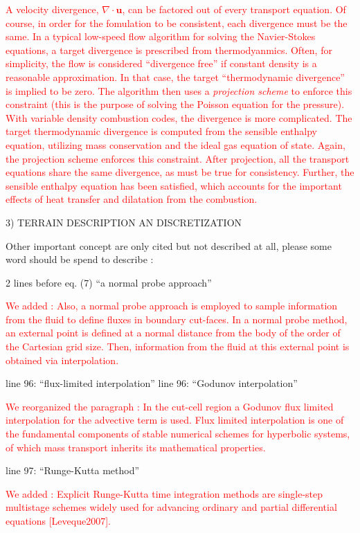 \documentclass[12pt]{article}
\newcommand\hl[1]{\textcolor{red}{#1}}
\begin{document}
\hl{A velocity divergence, $\nabla\cdot\mathbf{u}$, can be factored out of every transport equation.  Of course, in order for the fomulation to be consistent, each divergence must be the same.  In a typical low-speed flow algorithm for solving the Navier-Stokes equations, a target divergence is prescribed from thermodyanmics.  Often, for simplicity, the flow is considered ``divergence free'' if constant density is a reasonable approximation.  In that case, the target ``thermodynamic divergence'' is implied to be zero. The algorithm then uses a \emph{projection scheme} to enforce this constraint (this is the purpose of solving the Poisson equation for the pressure). With variable density combustion codes, the divergence is more complicated.  The target thermodynamic divergence is computed from the sensible enthalpy equation, utilizing mass conservation and the ideal gas equation of state. Again, the projection scheme enforces this constraint.  After projection, all the transport equations share the same divergence, as must be true for consistency.  Further, the sensible enthalpy equation has been satisfied, which accounts for the important effects of heat transfer and dilatation from the combustion.}

3) TERRAIN DESCRIPTION AN DISCRETIZATION

Other important concept are only cited but not described at all, please some word should be spend to describe :

2 lines before eq. (7) ``a normal probe approach''

\hl{We added : Also, a normal probe approach is employed to sample information from the fluid to define fluxes in boundary cut-faces. In a normal probe method, an external point is defined at a normal distance from the body of the order of the Cartesian grid size. Then, information from the fluid at this external point is obtained via interpolation. }

line 96: ``flux-limited interpolation'' 
line 96: ``Godunov interpolation'' 

\hl{We reorganized the paragraph : In the cut-cell region a Godunov flux limited interpolation for the advective term is used. Flux limited interpolation is one of the fundamental components of stable numerical schemes for hyperbolic systems, of which mass transport inherits its mathematical properties.}

line 97: ``Runge-Kutta method'' 

\hl{We added : Explicit Runge-Kutta time integration methods are single-step multistage schemes widely used for advancing ordinary and partial differential equations [Leveque2007].}
\end{document}
